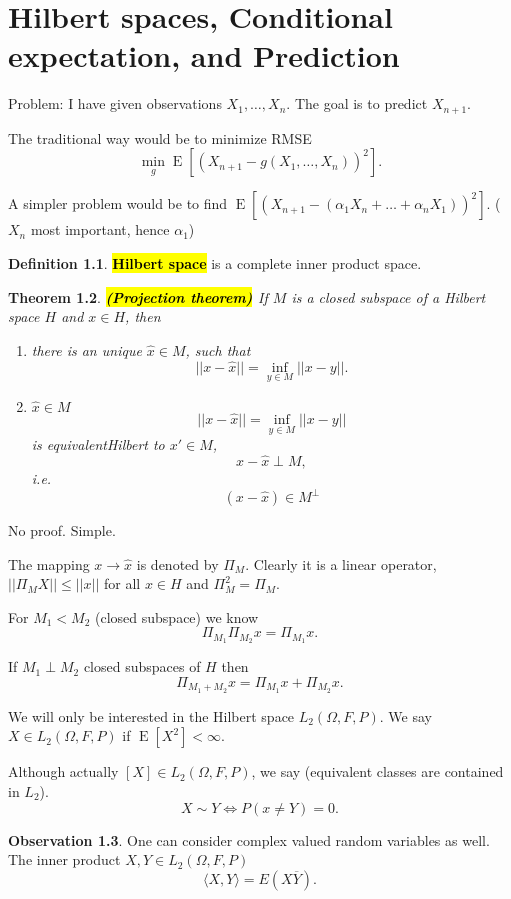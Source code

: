 \documentclass[12pt,a4paper, notitlepage]{book}
\newcommand{\hlc}[2][yellow]{ {\sethlcolor{#1} \hl{#2}} }
\newcommand{\hlcr}[1]{\hlc[lightred]{#1}}
\theoremstyle{definition} %
\newtheorem{definition}{Definition}[section]
\newtheorem{observation}[definition]{Observation}
\theoremstyle{plain} %
\newtheorem{theorem}[definition]{Theorem}
\DeclareMathOperator{\E}{E}
\newcommand{\New}[1]{ {\bf \hlcr{#1} } }
\begin{document}
\newpage
\chapter{Hilbert spaces, Conditional expectation, and Prediction}

\vskip1cm

Problem: I have given observations $X_1, \dots, X_n$. The goal is to predict $X_{n+1}$. 

The traditional way would be to minimize RMSE 
\[ \min_g \E[ (X_{n+1} - g(X_1, \dots, X_n))^2 ] . \]

A simpler problem would be to find $ \E[(X_{n+1} - (\alpha_1 X_n + \dots + \alpha_n X_1))^2 ] $. ($X_n$ most important, hence $\alpha_1$)

\begin{definition}
\New{ Hilbert space} is a complete inner product space.
\end{definition}

\begin{theorem} \New{ (Projection theorem) }
If $M$ is a closed subspace of a Hilbert space $H$ and $x \in H$, then
\begin{enumerate}
\item there is an unique $\hat{x} \in M$, such that
\[ || x - \hat{x}|| = \inf_{y \in M}|| x - y || . \]
\item $\hat{x} \in M $ 
\[ || x - \hat{x}|| = \inf_{y \in M}|| x - y || \] is equivalentHilbert to $x' \in M$, 
\[ x - \hat{x} \perp M , \] i.e.
\[ (x - \hat{x}) \in M^{\perp} \]
\end{enumerate}
\end{theorem}
\proof
No proof. Simple.
\endproof


The mapping $x \rightarrow \hat{x}$ is denoted by $\Pi_M$. Clearly it is a linear operator, $|| \Pi_M X|| \leq ||x||$ for all $x \in H$ and $\Pi_M^2 = \Pi_M$. 

For $M_1 < M_2$ (closed subspace) we know 
\[\Pi_{M_1}\Pi_{M_2}x = \Pi_{M_1}x. \]

If $M_1 \perp M_2$ closed subspaces of $H$ then 
 \[ \Pi_{M_1 + M_2} x = \Pi_{M_1}x + \Pi_{M_2}x. \]

We will only be interested in the Hilbert space $L_2(\Omega, F, P)$. We say $X \in L_2(\Omega, F, P)$ if $\E[X^2] < \infty$.

Although actually $[X] \in L_2(\Omega, F, P)$, we say 
 (equivalent classes are contained in $L_2$). 
\[ X \sim Y \iff P(x \neq Y) = 0. \]
\begin{observation}
One can consider complex valued random variables as well. The inner product $X, Y \in L_2(\Omega, F, P)$
\[  \langle X,Y \rangle = E(X \overline{Y}). \]
\end{observation}
\end{document}
